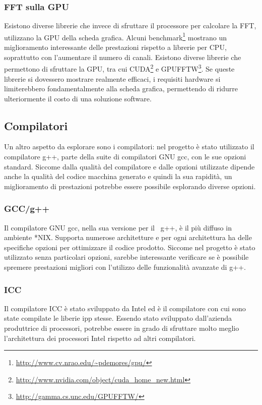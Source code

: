 \subsubsection{\ac{FFT} sulla GPU}
Esistono diverse librerie che invece di sfruttare il processore per calcolare la
\ac{FFT}, utilizzano la GPU della scheda grafica. Alcuni
benchmark\footnote{\url{http://www.cv.nrao.edu/~pdemores/gpu/}} mostrano un
miglioramento interessante delle prestazioni rispetto a librerie per CPU,
soprattutto con l'aumentare il numero di canali. Esistono diverse librerie che
permettono di sfruttare la GPU, tra cui
CUDA\footnote{\url{http://www.nvidia.com/object/cuda_home_new.html}} e
GPUFFTW\footnote{\url{http://gamma.cs.unc.edu/GPUFFTW/}}. Se queste librerie si
dovessero mostrare realmente efficaci, i requisiti hardware si limiterebbero
fondamentalmente alla scheda grafica, permettendo di ridurre ulteriormente il
costo di una soluzione software.

\subsection{Compilatori}
Un altro aspetto da esplorare sono i compilatori: nel progetto \`e stato
utilizzato il compilatore g++, parte della suite di compilatori GNU gcc, con le
sue opzioni standard. Siccome dalla qualit\`a del compilatore e dalle opzioni
utilizzate dipende anche la qualit\`a del codice macchina generato e quindi la
sua rapidit\`a, un miglioramento di prestazioni potrebbe essere possibile
esplorando diverse opzioni.

\subsubsection{GCC/g++}
Il compilatore GNU gcc, nella sua versione per il \CC\, g++, \`e il pi\`u
diffuso in ambiente *NIX. Supporta numerose architetture e per ogni architettura
ha delle specifiche opzioni per ottimizzare il codice prodotto. Siccome nel
progetto \`e stato utilizzato senza particolari opzioni, sarebbe interessante
verificare se \`e possibile spremere prestazioni migliori con l'utilizzo delle
funzionalit\`a avanzate di g++.

\subsubsection{ICC}
Il compilatore ICC \`e stato sviluppato da Intel ed \`e il compilatore con cui
sono state compilate le liberie \ac{ipp} stesse. Essendo stato sviluppato
dall'azienda produttrice di processori, potrebbe essere in grado di sfruttare
molto meglio l'architettura dei processori Intel rispetto ad altri compilatori.

